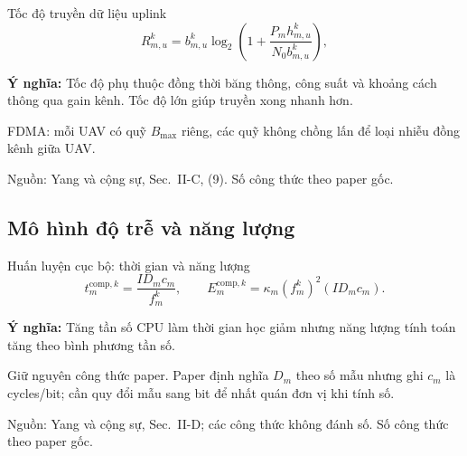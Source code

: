 \documentclass[10pt,aspectratio=43]{beamer}
\newcommand{\source}[1]{\par\vfill{\fontsize{5.8}{7}\selectfont\color{Muted}Nguồn: #1\par}}
\newcommand{\paperref}[1]{\source{Yang và cộng sự, Sec.~#1. Số công thức theo paper gốc.}}
\newcommand{\eqmeaning}[1]{\par\medskip\textcolor{HustRed}{\textbf{Ý nghĩa:}} #1\par}
\newcommand{\noteonly}[1]{\par{\footnotesize\color{Muted}#1\par}}
\begin{document}
\begin{frame}[t]{Tốc độ truyền dữ liệu uplink}
\relax
\begin{equation}R_{m,u}^k=b_{m,u}^k\log_2\!\left(1+\frac{P_mh_{m,u}^k}{N_0b_{m,u}^k}\right),\tag{9}\end{equation}\par{}\eqmeaning{Tốc độ phụ thuộc đồng thời băng thông, công suất và khoảng cách thông qua gain kênh. Tốc độ lớn giúp truyền xong nhanh hơn.}
\noteonly{FDMA: mỗi UAV có quỹ $B_{\max}$ riêng, các quỹ không chồng lấn để loại nhiễu đồng kênh giữa UAV.}
\paperref{II-C, (9)}
\end{frame}
\subsection{Mô hình độ trễ và năng lượng}

\begin{frame}[t]{Huấn luyện cục bộ: thời gian và năng lượng}
\relax
\[
t_m^{\mathrm{comp},k}=\frac{ID_mc_m}{f_m^k},\qquad
E_m^{\mathrm{comp},k}=\kappa_m(f_m^k)^2(ID_mc_m).
\]
\par{}
\eqmeaning{Tăng tần số CPU làm thời gian học giảm nhưng năng lượng tính toán tăng theo bình phương tần số.}
\noteonly{Giữ nguyên công thức paper. Paper định nghĩa $D_m$ theo số mẫu nhưng ghi $c_m$ là cycles/bit; cần quy đổi mẫu sang bit để nhất quán đơn vị khi tính số.}
\paperref{II-D; các công thức không đánh số}
\end{frame}
\end{document}
